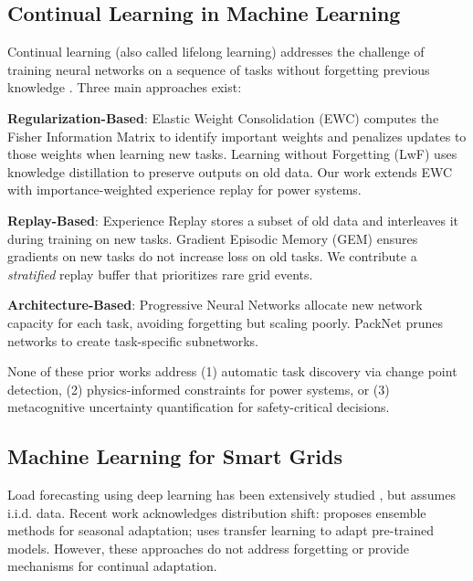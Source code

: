 \documentclass[journal]{IEEEtran}
\begin{document}
\subsection{Continual Learning in Machine Learning}

Continual learning (also called lifelong learning) addresses the challenge of training neural networks on a sequence of tasks without forgetting previous knowledge \cite{parisi2019continual}. Three main approaches exist:

\textbf{Regularization-Based}: Elastic Weight Consolidation (EWC) \cite{kirkpatrick2017overcoming} computes the Fisher Information Matrix to identify important weights and penalizes updates to those weights when learning new tasks. Learning without Forgetting (LwF) \cite{li2017learning} uses knowledge distillation to preserve outputs on old data. Our work extends EWC with importance-weighted experience replay for power systems.

\textbf{Replay-Based}: Experience Replay \cite{rolnick2019experience} stores a subset of old data and interleaves it during training on new tasks. Gradient Episodic Memory (GEM) \cite{lopez2017gradient} ensures gradients on new tasks do not increase loss on old tasks. We contribute a \textit{stratified} replay buffer that prioritizes rare grid events.

\textbf{Architecture-Based}:  Progressive Neural Networks \cite{rusu2016progressive} allocate new network capacity for each task, avoiding forgetting but scaling poorly. PackNet \cite{mallya2018packnet} prunes networks to create task-specific subnetworks.

None of these prior works address (1) automatic task discovery via change point detection, (2) physics-informed constraints for power systems, or (3) metacognitive uncertainty quantification for safety-critical decisions.

\subsection{Machine Learning for Smart Grids}

Load forecasting using deep learning has been extensively studied \cite{wang2019deep, hong2020short}, but assumes i.i.d. data. Recent work acknowledges distribution shift: \cite{hong2021probabilistic} proposes ensemble methods for seasonal adaptation; \cite{zhang2022transfer} uses transfer learning to adapt pre-trained models. However, these approaches do not address forgetting or provide mechanisms for continual adaptation.
\end{document}
